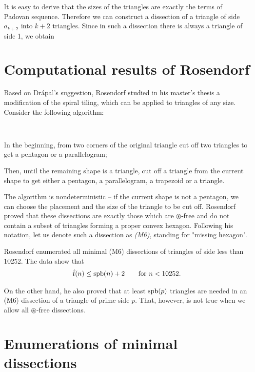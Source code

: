 It is easy to derive that the sizes of the triangles are exactly the terms of Padovan sequence. Therefore we can construct a dissection of a triangle of side $a_{k+2}$ into $k+2$ triangles. Since in such a dissection there is always a triangle of side 1, we obtain
%


\section{Computational results of Rosendorf}
Based on Drápal's suggestion, Rosendorf studied in his master's thesis \cite{Rosendorf04} a modification of the spiral tiling, which can be applied to triangles of any size. Consider the following algorithm:

\begin{alg} \ 
	\begin{cosyitemize}
		\item In the beginning, from two corners of the original triangle cut off two triangles to get a pentagon or a parallelogram;
		\item Then, until the remaining shape is a triangle, cut off a triangle from the current shape to get either a pentagon, a parallelogram, a trapezoid or a triangle.
	\end{cosyitemize}
\end{alg}%

The algorithm is nondeterministic -- if the current shape is not a pentagon, we can choose the placement and the size of the triangle to be cut off. Rosendorf proved that these dissections are exactly those which are $\circledast$-free and do not contain a subset of triangles forming a proper convex hexagon. Following his notation, let us denote such a dissection as \emph{(M6)}, standing for "missing hexagon".

Rosendorf enumerated all minimal (M6) dissections of triangles of side less than 10252. The data show that
\begin{align}
	\hat{t}(n) \leq \mathop{\mathrm{spb}}(n)+2 \qquad\hbox{for $n < 10252$.}
\end{align}

On the other hand, he also proved that at least $\mathop{\mathrm{spb}}(p)$ triangles are needed in an (M6) dissection of a triangle of prime side $p$. That, however, is not true when we allow all $\circledast$-free dissections.


\section{Enumerations of minimal dissections}

